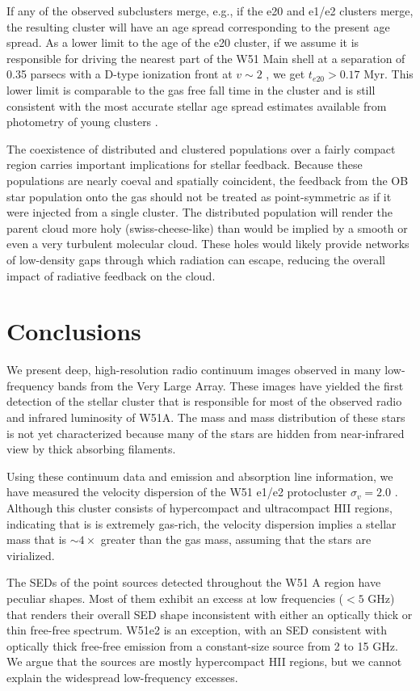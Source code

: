 If any of the observed subclusters merge, e.g., if the e20 and e1/e2 clusters
merge, the resulting cluster will have an age spread corresponding to the present
age spread.  As a lower limit to the age of the e20 cluster, if we assume it is
responsible for driving the nearest part of the W51 Main shell at a separation
of 0.35 parsecs with a D-type ionization front at $v\sim2$ \kms, we get
$t_{e20} > 0.17$ Myr.  This lower limit is comparable to the gas free fall
time in the cluster and is still consistent with the most accurate stellar age
spread estimates available from photometry of young clusters
\citep[e.g.,][]{Kudryavtseva2012a}.

The coexistence of distributed and clustered populations over a fairly compact
region carries important implications for stellar feedback.  Because these
populations are nearly coeval and spatially coincident, the feedback from the
OB star population onto the gas should not be treated as point-symmetric as if
it were injected from a single cluster.  The distributed population will render
the parent cloud more holy (swiss-cheese-like) than would be implied by a
smooth or even a very turbulent molecular cloud.  These holes would likely
provide networks of low-density gaps through which radiation can escape,
reducing the overall impact of radiative feedback on the cloud.

\section{Conclusions}
We present deep, high-resolution radio continuum images observed in many
low-frequency bands from the Very Large Array.  These images have yielded the
first detection of the stellar cluster that is responsible for most of the
observed radio and infrared luminosity of W51A.  The mass and mass distribution
of these stars is not yet characterized because many of the stars are hidden
from near-infrared view by thick absorbing filaments.

Using these continuum data and \formaldehyde emission and absorption line
information, we have measured the velocity dispersion of the W51 e1/e2
protocluster $\sigma_v=2.0$ \kms.  Although this cluster consists of
hypercompact and ultracompact HII regions, indicating that is is extremely
gas-rich, the velocity dispersion implies a stellar mass that is $\sim4\times$
greater than the gas mass, assuming that the stars are virialized.

The SEDs of the point sources detected throughout the W51 A region have
peculiar shapes.  Most of them exhibit an excess at low frequencies ($<5$ GHz)
that renders their overall SED shape inconsistent with either an optically
thick or thin free-free spectrum.  W51e2 is an exception, with an SED
consistent with optically thick free-free emission from a constant-size source
from 2 to 15 GHz.  We argue that the sources are mostly hypercompact HII
regions, but we cannot explain the widespread low-frequency excesses.

